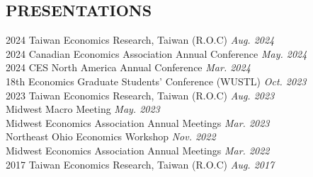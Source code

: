 \documentclass[10pt]{res} %
\begin{document}
\begin{resume}

%
%


\section{PRESENTATIONS}%
\label{sub:conference_paper}
2024 Taiwan Economics Research, Taiwan (R.O.C) \hfill  \textit{Aug. 2024} \\
2024 Canadian Economics Association Annual Conference \hfill \textit{May. 2024} \\
2024 CES North America Annual Conference \hfill \textit{Mar. 2024} \\
18th Economics Graduate Students' Conference (WUSTL) \hfill \textit{Oct. 2023} \\
2023 Taiwan Economics Research, Taiwan (R.O.C) \hfill  \textit{Aug. 2023} \\
Midwest Macro Meeting \hfill \textit{May. 2023} \\
Midwest Economics Association Annual Meetings \hfill \textit{Mar. 2023} \\
Northeast Ohio Economics Workshop \hfill \textit{Nov. 2022} \\
Midwest Economics Association Annual Meetings \hfill \textit{Mar. 2022} \\
2017 Taiwan Economics Research, Taiwan (R.O.C) \hfill  \textit{Aug. 2017} \\

\vspace{-10pt}


\end{resume}
\end{document}
